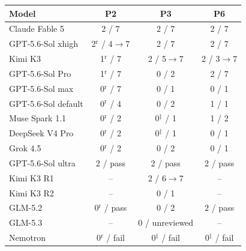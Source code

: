 \begin{tabular}{@{}lccc@{}}
  \toprule
  Model & P2 & P3 & P6 \\
  \midrule
    Claude Fable 5 & 2 / 7 & 2 / 7 & 2 / 7 \\
    GPT-5.6-Sol xhigh & 2$^{\mathrm{r}}$ / 4$\to$7 & 2 / 7 & 2 / 7 \\
    Kimi K3 & 1$^{\mathrm{r}}$ / 7 & 2 / 5$\to$7 & 2 / 3$\to$7 \\
    GPT-5.6-Sol Pro & 1$^{\mathrm{r}}$ / 7 & 0 / 2 & 2 / 7 \\
    GPT-5.6-Sol max & 0$^{\mathrm{r}}$ / 7 & 0 / 1 & 0 / 1 \\
    GPT-5.6-Sol default & 0$^{\mathrm{r}}$ / 4 & 0 / 2 & 1 / 1 \\
    Muse Spark 1.1 & 0$^{\mathrm{r}}$ / 2 & 0$^{\ddagger}$ / 1 & 1 / 2 \\
    DeepSeek V4 Pro & 0$^{\mathrm{r}}$ / 2 & 0$^{\ddagger}$ / 1 & 0 / 1 \\
    Grok 4.5 & 0$^{\mathrm{r}}$ / 2 & 0 / 2 & 0 / 1 \\
    \midrule
    GPT-5.6-Sol ultra & 2 / pass & 2 / pass & 2 / pass \\
    Kimi K3 R1 & -- & 2 / 6$\to$7 & -- \\
    Kimi K3 R2 & -- & 0 / 1 & -- \\
    GLM-5.2 & 0$^{\mathrm{r}}$ / pass & 0 / 2 & 2 / pass \\
    GLM-5.3 & -- & 0 / unreviewed & -- \\
    Nemotron & 0$^{\mathrm{r}}$ / fail & 0$^{\ddagger}$ / fail & 0$^{\ddagger}$ / fail \\
  \bottomrule
\end{tabular}
